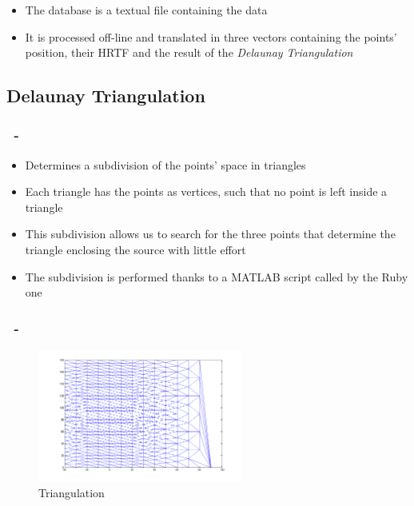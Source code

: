 \documentclass{beamer}
\begin{document}
	\begin{frame}
		\frametitle{\insertsection}
		\begin{itemize}
			\item The database is a textual file containing the data
			\item It is processed off-line and translated in three vectors containing the
              points' position, their \textsc{HRTF} and the result of the {\em Delaunay Triangulation}
		\end{itemize}
	\end{frame}

	\subsection{Delaunay Triangulation}

	\begin{frame}
		\frametitle{\insertsection\ - \insertsubsection}
		\begin{itemize}
			\item Determines a subdivision of the points' space in triangles
			\item Each triangle has the points as vertices, such that no point is left inside a triangle
			\item This subdivision allows us to search for the three points that determine the triangle enclosing the
				source with little effort
			\item The subdivision is performed thanks to a MATLAB script called by the Ruby one
		\end{itemize}
	\end{frame}

	\begin{frame}
		\frametitle{\insertsection\ - \insertsubsection}
		\begin{figure}
			\centering
			  \includegraphics[width=0.6\textwidth]{images/triangulation.png}
			  \caption{Triangulation}
		\end{figure}
	\end{frame}
\end{document}
